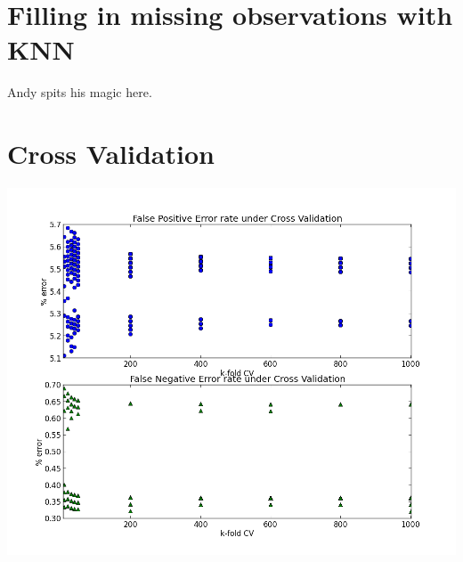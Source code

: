 \documentclass[11pt]{article}
\begin{document}
\section{Filling in missing observations with KNN}
Andy spits his magic here. 

\section{Cross Validation}
\includegraphics[width = 20cm]{CV_5K_1Kfold.png}
\end{document}
